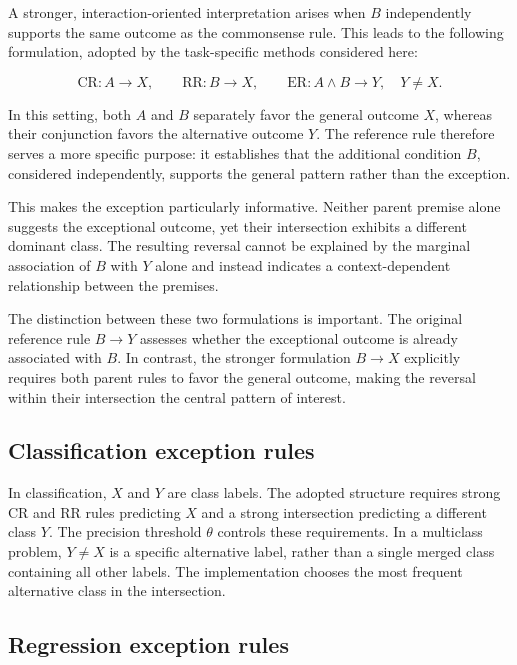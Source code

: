 A stronger, interaction-oriented interpretation arises when
\(B\) independently supports the same outcome as the
commonsense rule. This leads to the following formulation,
adopted by the task-specific methods considered here:

\[
\mathrm{CR}: A\to X,\qquad
\mathrm{RR}: B\to X,\qquad
\mathrm{ER}: A\land B\to Y,\quad Y\ne X.
\]

In this setting, both \(A\) and \(B\) separately favor the
general outcome \(X\), whereas their conjunction favors
the alternative outcome \(Y\). The reference rule therefore
serves a more specific purpose: it establishes that the
additional condition \(B\), considered independently,
supports the general pattern rather than the exception.

This makes the exception particularly informative. Neither
parent premise alone suggests the exceptional outcome,
yet their intersection exhibits a different dominant class.
The resulting reversal cannot be explained by the marginal
association of \(B\) with \(Y\) alone and instead indicates
a context-dependent relationship between the premises.

The distinction between these two formulations is important.
The original reference rule \(B\to Y\) assesses whether the
exceptional outcome is already associated with \(B\).
In contrast, the stronger formulation \(B\to X\) explicitly
requires both parent rules to favor the general outcome,
making the reversal within their intersection the central
pattern of interest.





\subsection{Classification exception rules}
\label{classification-exception-rules}
In classification, \(X\) and \(Y\) are class labels. The adopted
structure requires strong CR and RR rules predicting \(X\) and a strong
intersection predicting a different class \(Y\). The precision threshold
\(\theta\) controls these requirements. In a multiclass problem,
\(Y\ne X\) is a specific alternative label, rather than a single merged
class containing all other labels. The implementation chooses the most frequent
alternative class in the intersection.



\subsection{Regression exception rules}
\label{regression-exception-rules}

